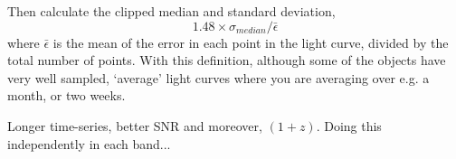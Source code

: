 \documentclass[usenatbib]{mnras}
\begin{document}
Then calculate the clipped median and standard deviation, 
\begin{equation}
1.48 \times \sigma_{median} / \bar{\epsilon}
\end{equation}
where $\bar{\epsilon}$ is the mean of the error in each point in the light curve, divided by the total number of points. 
With this definition, although some of the objects have very well sampled, 
`average' light curves where you are averaging over e.g. a month, or two weeks. 

Longer time-series, better SNR and moreover, $(1+z)$. 
Doing this independently in each band...



\end{document}
